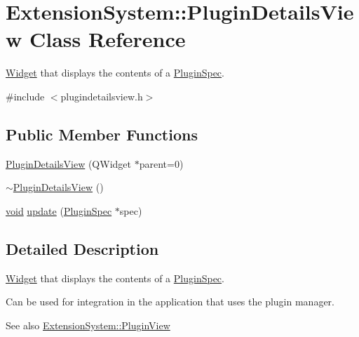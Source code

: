 \hypertarget{class_extension_system_1_1_plugin_details_view}{\section{\-Extension\-System\-:\-:\-Plugin\-Details\-View \-Class \-Reference}
\label{class_extension_system_1_1_plugin_details_view}
}


\hyperlink{class_widget}{\-Widget} that displays the contents of a \hyperlink{class_extension_system_1_1_plugin_spec}{\-Plugin\-Spec}.  




{\ttfamily \#include $<$plugindetailsview.\-h$>$}

\subsection*{\-Public \-Member \-Functions}
\begin{DoxyCompactItemize}
\item 
\hyperlink{class_extension_system_1_1_plugin_details_view_a8f7deb5b304aba85440152d7f013d7ae}{\-Plugin\-Details\-View} (\-Q\-Widget $\ast$parent=0)
\item 
\hyperlink{class_extension_system_1_1_plugin_details_view_a9ad4e8bdf2f3e42e1ac0f024697faed5}{$\sim$\-Plugin\-Details\-View} ()
\item 
\hyperlink{group___u_a_v_objects_plugin_ga444cf2ff3f0ecbe028adce838d373f5c}{void} \hyperlink{class_extension_system_1_1_plugin_details_view_a988a4f37a2b5719f3d8f52ff1958ba88}{update} (\hyperlink{class_extension_system_1_1_plugin_spec}{\-Plugin\-Spec} $\ast$spec)
\end{DoxyCompactItemize}


\subsection{\-Detailed \-Description}
\hyperlink{class_widget}{\-Widget} that displays the contents of a \hyperlink{class_extension_system_1_1_plugin_spec}{\-Plugin\-Spec}. 

\-Can be used for integration in the application that uses the plugin manager.

\begin{DoxySeeAlso}{\-See also}
\hyperlink{class_extension_system_1_1_plugin_view}{\-Extension\-System\-::\-Plugin\-View} 
\end{DoxySeeAlso}


